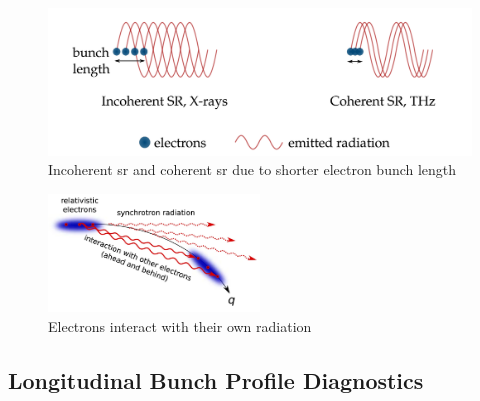 \begin{figure}[tbh]
	\centering
	\includegraphics[width = \textwidth]{chap/02-theory/img/csr2.png}
	\caption{Incoherent \gls{sr} and coherent \gls{sr} due to shorter electron bunch length \cite{rota2018}}
	\label{fig:csr}
\end{figure}

\begin{figure}[tbh]
	\centering
	\includegraphics[width = 0.5\textwidth]{chap/02-theory/img/microbunching}
	\caption{Electrons interact with their own radiation \cite{Bielawski2019}}
	\label{fig:microBunch}
\end{figure}


\subsection{Longitudinal Bunch Profile Diagnostics}

